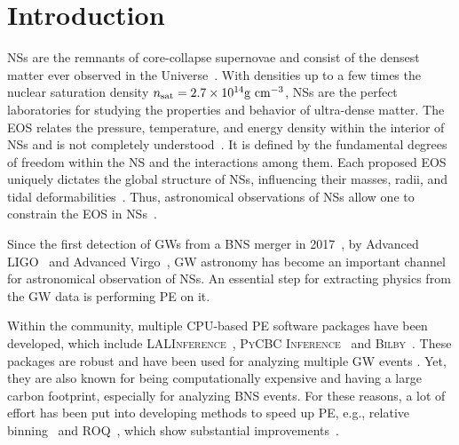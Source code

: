 \documentclass[prd,twocolumn,a4paper,floatfix,nofootinbib,preprintnumbers,superscriptaddress]{revtex4-1}
\begin{document}
\maketitle

\section{Introduction} \label{sec:intro}

\noindent \Acp{NS} are the remnants of core-collapse supernovae and consist of the densest matter ever observed in the Universe~\cite{Lattimer:2012nd,Ozel:2016oaf}. With densities up to a few times the nuclear saturation density $n_{\rm sat} = 2.7 \times 10^{14}{\rm g \ cm}^{-3}$, \acp{NS} are the perfect laboratories for studying the properties and behavior of ultra-dense matter. The \ac{EOS} relates the pressure, temperature, and energy density within the interior of \acp{NS} and is not completely understood~\cite{Tews:2022yfb}. It is defined by the fundamental degrees of freedom within the \ac{NS} and the interactions among them. Each proposed \ac{EOS} uniquely dictates the global structure of \acp{NS}, influencing their masses, radii, and tidal deformabilities~\cite{Hinderer:2009ca,Damour:2009vw,Lindblom1992-zb}. Thus, astronomical observations of \acp{NS} allow one to constrain the \ac{EOS} in \acp{NS}~\cite{Flanagan:2007ix, DelPozzo:2013ala,Agathos:2015uaa, Demorest:2010bx, Antoniadis:2013pzd, Arzoumanian:2017puf, Cromartie:2019kug, Miller:2019cac, Riley:2019yda, Miller:2021qha, Riley:2021pdl}.

Since the first detection of \acp{GW} from a \ac{BNS} merger in 2017~\cite{LIGOScientific:2017vwq}, by Advanced LIGO~\cite{LIGOScientific:2014pky} and Advanced Virgo~\cite{VIRGO:2014yos}, \ac{GW} astronomy has become an important channel for astronomical observation of \acp{NS}. An essential step for extracting physics from the \ac{GW} data is performing \ac{PE} on it.

Within the community, multiple \ac{CPU}-based \ac{PE} software packages have been developed, which include \textsc{LALInference}~\cite{Veitch:2014wba}, \textsc{PyCBC Inference}~\cite{Biwer:2018osg} and \textsc{Bilby}~\cite{Ashton:2018jfp,Romero-Shaw:2020owr,Smith:2019ucc}. These packages are robust and have been used for analyzing multiple \ac{GW} events \cite{LIGOScientific:2017vwq,LIGOScientific:2020aai}. Yet, they are also known for being computationally expensive and having a large carbon footprint, especially for analyzing \ac{BNS} events. For these reasons, a lot of effort has been put into developing methods to speed up \ac{PE}, e.g., relative binning~\cite{Cornish:2010kf,Zackay:2018qdy} and \ac{ROQ}~\cite{Canizares:2013ywa, Canizares:2014fya}, which show substantial improvements~\cite{Krishna:2023bug,Morisaki:2023kuq}.
\end{document}

